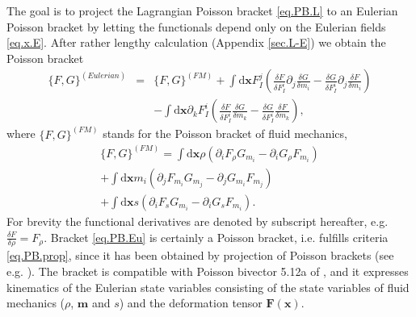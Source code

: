 \documentclass[
10pt, %
a4paper, %
oneside, %
headinclude,footinclude, %
BCOR5mm, %
]{scrartcl}
\newcommand{\xx}{\mathbf{x}}
\newcommand{\dx}{\mathrm{d}\xx}
\newcommand{\mm}{\mathbf{m}}
\newcommand{\FF}{\mathbf{F}}
\begin{document}
The goal is to project the Lagrangian Poisson bracket \eqref{eq.PB.L} to an Eulerian Poisson bracket by letting the functionals depend only on the Eulerian fields \eqref{eq.x.E}. After rather lengthy calculation (Appendix \ref{sec.L-E}) we obtain the Poisson bracket
\begin{eqnarray}\label{eq.PB.Eu}
	\{F,G\}^{(Eulerian)} &=& \{F,G\}^{(FM)} + \int\dx F^j_I \left(\frac{\delta F}{\delta F^i_I} \partial_j \frac{\delta G}{\delta m_i}-\frac{\delta G}{\delta F^i_I} \partial_j \frac{\delta F}{\delta m_i}\right)\nonumber\\
	&&-\int\dx \partial_k F^i_I \left(\frac{\delta F}{\delta F^i_I} \frac{\delta G}{\delta m_k}-\frac{\delta G}{\delta F^i_I} \frac{\delta F}{\delta m_k}\right),
\end{eqnarray}
where $\{F,G\}^{(FM)}$ stands for the Poisson bracket of fluid mechanics,
\begin{multline}
	\{F,G\}^{(FM)} = \int\dx \rho (\partial_i F_\rho G_{m_i}-\partial_i G_\rho F_{m_i})\\
	+ \int\dx m_i (\partial_j F_{m_i} G_{m_j}-\partial_j G_{m_i} F_{m_j})\\
	+ \int\dx s (\partial_i F_s G_{m_i}-\partial_i G_s F_{m_i}).
\end{multline}
For brevity the functional derivatives are denoted by subscript hereafter, e.g. $\frac{\delta F}{\delta \rho} = F_\rho$.
Bracket \eqref{eq.PB.Eu} is certainly a Poisson bracket, i.e. fulfills criteria \eqref{eq.PB.prop}, since it has been obtained by projection of Poisson brackets (see e.g. \cite{PhysD-hierarchy}). The bracket is compatible with Poisson bivector 5.12a of \cite{Markus2009}, and it expresses kinematics of the Eulerian state variables consisting of the state variables of fluid mechanics ($\rho$, $\mm$ and $s$) and the deformation tensor $\FF(\xx)$.
\end{document}
